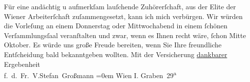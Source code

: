 \begin{ledgroupsized}[t]{13cm}
           \pstart
           Für eine andächtig u aufmerkſam lauſchende Zuhörerſchaft, aus der Elite der Wiener Arbeiterſchaft zuſammengesetzt, kann ich
               mich verbürgen.\pend
           \pstart
           Wir würden die Vorleſung an einem Donnerstag oder Mittwochabend in einem ſchönen
               Verſammlungsſaal veranſtalten und zwar, wenn es Ihnen recht wäre, ſchon Mitte
               Oktober.\pend
           \pstart
            Es würde uns große Freude bereiten, wenn Sie
               Ihre freundliche Entſcheidung bald bekanntgeben wollten.\pend
           \pstart
           Mit der Versicherung \uline{dankbarer} Ergebenheit{\\[\baselineskip]}
                  f. d. Fr. V.\spacefill\mbox{Stefan Großmann}\pend
           \leftskip=0em{}\pstart
           \noindent{}Wien I. Graben 29\textsuperscript{a}\pend
           
         
         \endnumbering{}\end{ledgroupsized}  \newcommand{\dateiname}{L01711}\newcommand{\titel}{Stefan Großmann an Arthur Schnitzler, 27. 9. 1907}\newcommand{\editorInnen}{ Martin Anton Müller und Gerd-Hermann Susen}
      